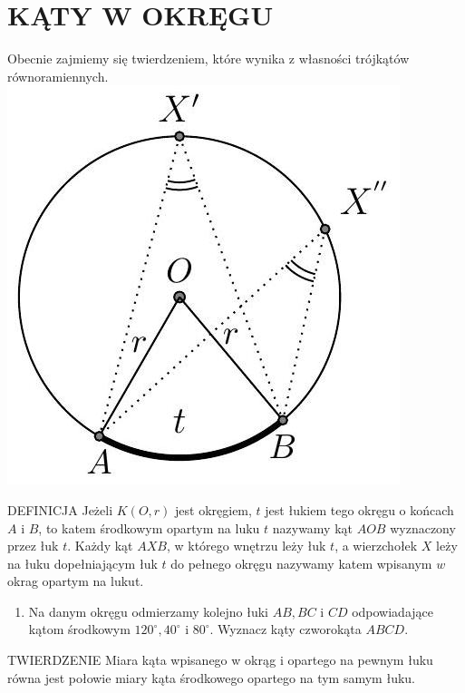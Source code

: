 \documentclass[10pt]{article}
\begin{document}
\section*{KĄTY W OKRĘGU}
Obecnie zajmiemy się twierdzeniem, które wynika z własności trójkątów równoramiennych.\\
\includegraphics[max width=\textwidth, center]{2024_11_21_71f62bd117d375398909g-180}

DEFINICJA Jeżeli \(K(O, r)\) jest okręgiem, \(t\) jest łukiem tego okręgu o końcach \(A\) i \(B\), to katem środkowym opartym na luku \(t\) nazywamy kąt \(A O B\) wyznaczony przez łuk \(t\). Każdy kąt \(A X B\), w którego wnętrzu leży łuk \(t\), a wierzchołek \(X\) leży na łuku dopełniającym łuk \(t\) do pełnego okręgu nazywamy katem wpisanym \(w\) okrag opartym na lukut.

\begin{enumerate}
  \item Na danym okręgu odmierzamy kolejno łuki \(A B, B C\) i \(C D\) odpowiadające kątom środkowym \(120^{\circ}, 40^{\circ}\) i \(80^{\circ}\). Wyznacz kąty czworokąta \(A B C D\).
\end{enumerate}

TWIERDZENIE Miara kąta wpisanego w okrąg i opartego na pewnym łuku równa jest połowie miary kąta środkowego opartego na tym samym łuku.
\end{document}
